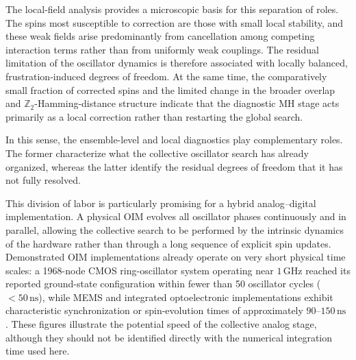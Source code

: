 \documentclass[
reprint,
amsmath,amssymb,
aps,
pre,
floatfix,
]{revtex4-2}
\begin{document}
The local-field analysis provides a microscopic basis for this separation
of roles. The spins most susceptible to correction are those with small
local stability, and these weak fields arise predominantly from
cancellation among competing interaction terms rather than from uniformly
weak couplings. The residual limitation of the oscillator dynamics is
therefore associated with locally balanced, frustration-induced degrees of
freedom. At the same time, the comparatively small fraction of corrected
spins and the limited change in the broader overlap and
$\mathbb{Z}_2$-Hamming-distance structure indicate that the diagnostic MH
stage acts primarily as a local correction rather than restarting the
global search.

In this sense, the ensemble-level and local diagnostics play complementary
roles. The former characterize what the collective oscillator search has
already organized, whereas the latter identify the residual degrees of
freedom that it has not fully resolved.

This division of labor is particularly promising for a hybrid
analog--digital implementation. A physical OIM evolves all oscillator
phases continuously and in parallel, allowing the collective search to be
performed by the intrinsic dynamics of the hardware rather than through a
long sequence of explicit spin updates. Demonstrated OIM implementations
already operate on very short physical time scales: a 1968-node CMOS
ring-oscillator system operating near $1\,\mathrm{GHz}$ reached its reported
ground-state configuration within fewer than 50 oscillator cycles
($<50\,\mathrm{ns}$), while MEMS and integrated optoelectronic
implementations exhibit characteristic synchronization or spin-evolution
times of approximately $90$--$150\,\mathrm{ns}$
\cite{Energy4,Deng2024,Wu2025}. These figures illustrate the potential
speed of the collective analog stage, although they should not be identified
directly with the numerical integration time used here.
\end{document}
